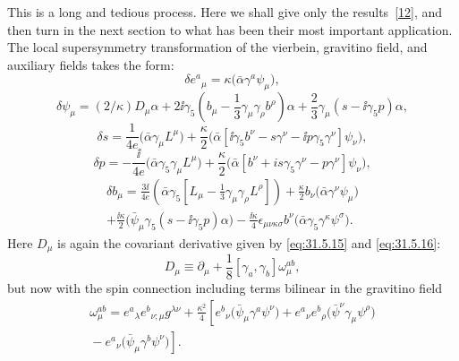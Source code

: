 This is a long and tedious process. Here we shall give only the
results~\hyperref[ch31-ref-12]{[12]}, and then turn in the next section
to what has been their most important application. The local
supersymmetry transformation of the vierbein, gravitino field, and
auxiliary fields takes the form:
\begin{equation}
  \delta e^a{}_\mu
  =\kappa\bigl(\bar\alpha\gamma^a\psi_\mu\bigr),
  \tag{31.6.1}\label{eq:31.6.1}
\end{equation}
\begin{equation}
  \delta\psi_\mu
  =(2/\kappa)D_\mu\alpha
  +2\ii\gamma_5\left(
    b_\mu-\frac{1}{3}\gamma_\mu\gamma_\rho b^\rho\right)\alpha
  +\frac{2}{3}\gamma_\mu(s-\ii\gamma_5p)\alpha,
  \tag{31.6.2}\label{eq:31.6.2}
\end{equation}
\begin{equation}
  \delta s
  =\frac{1}{4e}\bigl(\bar\alpha\gamma_\mu L^\mu\bigr)
  +\frac{\kappa}{2}
   \bigl(\bar\alpha
   [\ii\gamma_5b^\nu-s\gamma^\nu-\ii p\gamma_5\gamma^\nu]\psi_\nu\bigr),
  \tag{31.6.3}\label{eq:31.6.3}
\end{equation}
\begin{equation}
  \delta p
  =-\frac{\ii}{4e}\bigl(\bar\alpha\gamma_5\gamma_\mu L^\mu\bigr)
  +\frac{\kappa}{2}
   \bigl(\bar\alpha
   [b^\nu+is\gamma_5\gamma^\nu-p\gamma^\nu]\psi_\nu\bigr),
  \tag{31.6.4}\label{eq:31.6.4}
\end{equation}
\begin{multline}
  \delta b_\mu
  =\frac{3\ii}{4e}
    \left(\bar\alpha\gamma_5
      \left[L_\mu-\frac{1}{3}\gamma_\mu\gamma_\rho L^\rho\right]\right)
  +\frac{\kappa}{2}b_\nu
    \bigl(\bar\alpha\gamma^\nu\psi_\mu\bigr)\\
  +\frac{\ii\kappa}{2}
    \bigl(\bar\psi_\mu\gamma_5(s-\ii\gamma_5p)\alpha\bigr)
  -\frac{\ii\kappa}{4}\epsilon_{\mu\nu\kappa\sigma}b^\nu
    \bigl(\bar\alpha\gamma_5\gamma^\kappa\psi^\sigma\bigr).
  \tag{31.6.5}\label{eq:31.6.5}
\end{multline}
Here \(D_\mu\) is again the covariant derivative given by
\eqref{eq:31.5.15} and \eqref{eq:31.5.16}:
\begin{equation}
  D_\mu\equiv
  \partial_\mu+\frac{1}{8}[\gamma_a,\gamma_b]\omega_\mu^{ab},
  \tag{31.6.6}\label{eq:31.6.6}
\end{equation}
but now with the spin connection including terms bilinear in the
gravitino field
\begin{multline}
  \omega_\mu^{ab}
  =e^a{}_\lambda e^b{}_{\nu;\mu}g^{\lambda\nu}
  +\frac{\kappa^2}{4}\left[
    e^b{}_\nu\bigl(\bar\psi_\mu\gamma^a\psi^\nu\bigr)
    +e^a{}_\nu e^b{}_\rho
      \bigl(\bar\psi^\nu\gamma_\mu\psi^\rho\bigr)\right.\\
  \left.
    {}-e^a{}_\nu\bigl(\bar\psi_\mu\gamma^b\psi^\nu\bigr)
  \right].
  \tag{31.6.7}\label{eq:31.6.7}
\end{multline}
